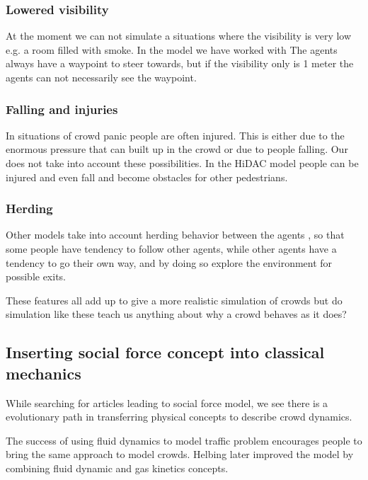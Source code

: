 \subsubsection{Lowered visibility}
At the moment we can not simulate a situations where the visibility is very low 
e.g. a room filled with smoke. In the model we have worked with The agents always 
have a waypoint to steer towards, but if the visibility only is 1 meter the 
agents can not necessarily see the waypoint. %

\subsubsection{Falling and injuries}
In situations of crowd panic people are often injured. This is either due to the 
enormous pressure that can built up in the crowd or due to people falling. Our 
does not take into account these possibilities. In the HiDAC model people can 
be injured and even fall and become obstacles for other pedestrians.\cite{HiDAC}

\subsubsection{Herding}
Other models take into account herding behavior between the agents  
\cite{helbing00}, so that some people have tendency to follow other agents, 
while other agents have a tendency to go their own way,  and by doing so 
explore the environment for possible exits.

These features all add up to give a more realistic simulation of crowds 
but do simulation like these teach us anything about why a crowd behaves 
as it does?

\subsection{Inserting social force concept into classical mechanics}
\label{subsec:development}
While searching for articles leading to social force model, we see there is a 
evolutionary path in transferring physical concepts to describe crowd dynamics.

The success of using fluid dynamics to model traffic problem encourages 
people to bring the same approach to model crowds. Helbing later improved the  
model by combining fluid dynamic and gas kinetics concepts\cite{social-force}. 

